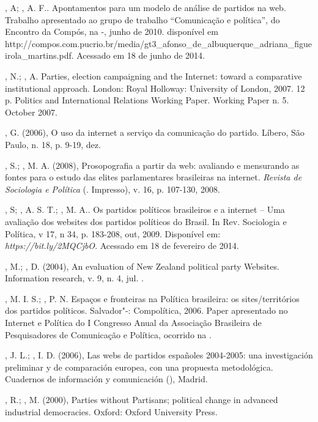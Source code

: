 \begin{Parskip}
, A; , A. F.. Apontamentos para um modelo de análise
de partidos na web. Trabalho apresentado ao grupo de trabalho
``Comunicação e política'', do  Encontro da Compós, na -, junho
de 2010. disponível em
http://compos.com.pucrio.br/media/gt3\_afonso\_de\_albuquerque\_adriana\_figueirola\_martins.pdf.
Acessado em 18 de junho de 2014.

, N.; , A. Parties, election campaigning and the
Internet: toward a comparative institutional approach. London: Royal
Holloway: University of London, 2007. 12 p. Politics and International
Relations Working Paper. Working Paper n. 5. October 2007.

, G. (2006), O uso da internet a serviço da comunicação do
partido. Líbero, São Paulo, n. 18, p. 9-19, dez.

, S.; , M. A. (2008), Prosopografia a partir da web:
avaliando e mensurando as fontes para o estudo das elites parlamentares
brasileiras na internet. \emph{Revista de Sociologia e Política} (.
Impresso), v. 16, p. 107-130, 2008.

, S; , A. S. T.; , M. A.. Os partidos políticos
brasileiros e a internet -- Uma avaliação dos websites dos partidos
políticos do Brasil. In Rev. Sociologia e Política, v 17, n 34, p.
183-208, out, 2009. Disponível em:
\emph{https://bit.ly/2MQCjbO}. Acessado em 18 de
fevereiro de 2014.

, M.; , D. (2004), An evaluation of New Zealand political
party Websites. Information research, v. 9, n. 4, jul. .

, M. I. S.; , P. N. Espaços e fronteiras na Política
brasileira: os sites/territórios dos partidos políticos. Salvador"-:
Compolítica, 2006. Paper apresentado no  Internet e Política do I
Congresso Anual da Associação Brasileira de Pesquisadores de Comunicação
e Política, ocorrido na .

, J. L.; , I. D. (2006), Las webs de partidos españoles
2004-2005: una investigación preliminar y de comparación europea, con
una propuesta metodológica. Cuadernos de información y comunicación
(), Madrid.

, R.; , M. (2000), Parties without Partisans; political
change in advanced industrial democracies. Oxford: Oxford University
Press.


\end{Parskip}
